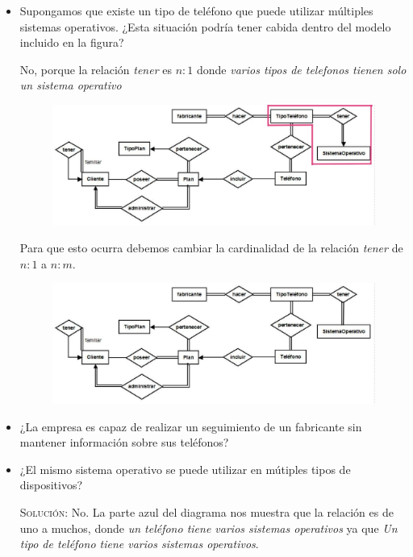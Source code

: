 \documentclass[letterpaper,11pt]{article}
\begin{document}
\begin{itemize}
    \item Supongamos que existe un tipo de teléfono que puede utilizar múltiples
    sistemas operativos. ¿Esta situación podría tener cabida dentro del modelo
    incluido en la figura?

    No, porque la relación \textit{tener} es $n:1$ donde \textit{varios tipos de
    telefonos tienen solo un sistema operativo}

    \begin{figure}[H]
        \centering
        \includegraphics[scale=0.4]{./imagenes/modelo7a.jpg}
    \end{figure}

    Para que esto ocurra debemos cambiar la cardinalidad de la relación
    \textit{tener} de $n:1$ a $n:m$.
    \begin{figure}[H]
        \centering
        \includegraphics[scale=0.4]{./imagenes/modelo7b.jpg}
    \end{figure}

    \item ¿La empresa es capaz de realizar un seguimiento de un fabricante sin
    mantener información sobre sus teléfonos?

    \item ¿El mismo sistema operativo se puede utilizar en mútiples tipos de
    dispositivos?

    \textsc{Solución:} No. La parte azul del diagrama nos muestra que la
    relación es de uno a muchos, donde \textit{un teléfono tiene varios
    sistemas operativos} ya que \textit{Un tipo de teléfono tiene varios
    sistemas operativos}.


\end{itemize}
\end{document}
